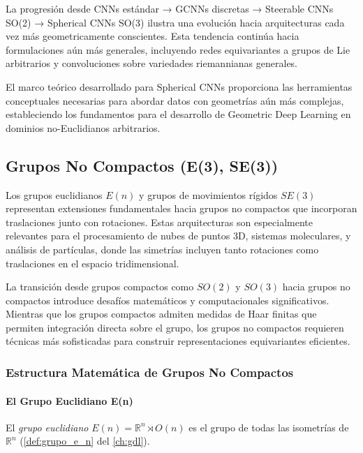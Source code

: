 La progresión desde \glspl{CNN} estándar → \glspl{GCNN} discretas → Steerable \glspl{CNN} SO(2) → Spherical \glspl{CNN} SO(3) ilustra una evolución hacia arquitecturas cada vez más geometricamente conscientes. Esta tendencia continúa hacia formulaciones aún más generales, incluyendo redes equivariantes a grupos de Lie arbitrarios y convoluciones sobre variedades riemannianas generales.

El marco teórico desarrollado para Spherical CNNs proporciona las herramientas conceptuales necesarias para abordar datos con geometrías aún más complejas, estableciendo los fundamentos para el desarrollo de Geometric Deep Learning en dominios no-Euclidianos arbitrarios.

\subsection{Grupos No Compactos (E(3), SE(3))}\label{subsec:grupos_no_compactos}

Los grupos euclidianos $E(n)$ y grupos de movimientos rígidos $SE(3)$ representan extensiones fundamentales hacia grupos no compactos que incorporan traslaciones junto con rotaciones. Estas arquitecturas son especialmente relevantes para el procesamiento de nubes de puntos 3D, sistemas moleculares, y análisis de partículas, donde las simetrías incluyen tanto rotaciones como traslaciones en el espacio tridimensional.

La transición desde grupos compactos como $SO(2)$ y $SO(3)$ hacia grupos no compactos introduce desafíos matemáticos y computacionales significativos. Mientras que los grupos compactos admiten medidas de Haar finitas que permiten integración directa sobre el grupo, los grupos no compactos requieren técnicas más sofisticadas para construir representaciones equivariantes eficientes.

\subsubsection{Estructura Matemática de Grupos No Compactos}

\paragraph{El Grupo Euclidiano E(n)}

El \textit{grupo euclidiano} $E(n) = \mathbb{R}^n \rtimes O(n)$ es el grupo de todas las isometrías de $\mathbb{R}^n$ (\autoref{def:grupo_e_n} del \autoref{ch:gdl}).\label{def:grupo_euclidiano}


